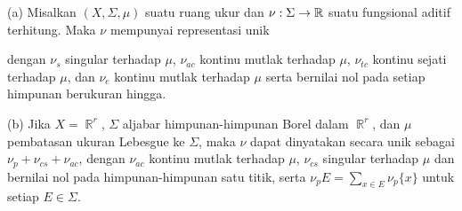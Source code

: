  (a) Misalkan $(X,\Sigma,\mu)$ suatu ruang ukur dan
$\nu:\Sigma\to\Bbb R$ suatu fungsional aditif terhitung. Maka $\nu$
mempunyai representasi unik


\noindent dengan $\nu_s$ singular terhadap $\mu$, $\nu_{ac}$ kontinu
mutlak terhadap $\mu$, $\nu_{tc}$ kontinu sejati terhadap $\mu$, dan
$\nu_e$ kontinu mutlak terhadap $\mu$ serta bernilai nol pada setiap
himpunan berukuran hingga.

(b) Jika $X=\BbbR^r$, $\Sigma$ aljabar himpunan-himpunan Borel dalam
$\BbbR^r$, dan $\mu$ pembatasan ukuran Lebesgue ke $\Sigma$, maka $\nu$
dapat dinyatakan secara unik sebagai $\nu_p+\nu_{cs}+\nu_{ac}$, dengan
$\nu_{ac}$ kontinu mutlak terhadap $\mu$, $\nu_{cs}$ singular terhadap
$\mu$ dan bernilai nol pada himpunan-himpunan satu titik, serta
$\nu_pE=\sum_{x\in E}\nu_p\{x\}$ untuk setiap $E\in\Sigma$.

